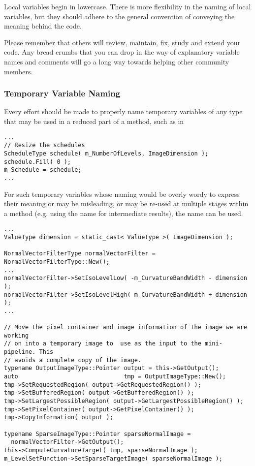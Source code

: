 Local variables begin in lowercase. There is more flexibility in the naming of
local variables, but they should adhere to the general convention of conveying
the meaning behind the code.

Please remember that others will review, maintain, fix, study and extend your
code. Any bread crumbs that you can drop in the way of explanatory variable
names and comments will go a long way towards helping other community members.


\subsubsection{Temporary Variable Naming}
\label{subsubsec:TemporaryVariableNaming}

Every effort should be made to properly name temporary variables of any type
that may be used in a reduced part of a method, such as in
\small
\begin{verbatim}
...
// Resize the schedules
ScheduleType schedule( m_NumberOfLevels, ImageDimension );
schedule.Fill( 0 );
m_Schedule = schedule;
...
\end{verbatim}
\normalsize

For such temporary variables whose naming would be overly wordy to
express their meaning or may be misleading, or may be re-used at multiple
stages within a method (e.g. using the name  for intermediate
results), the name  can be used.
\small
\begin{verbatim}
...
ValueType dimension = static_cast< ValueType >( ImageDimension );

NormalVectorFilterType normalVectorFilter = NormalVectorFilterType::New();
...
normalVectorFilter->SetIsoLevelLow( -m_CurvatureBandWidth - dimension );
normalVectorFilter->SetIsoLevelHigh( m_CurvatureBandWidth + dimension );
...

// Move the pixel container and image information of the image we are working
// on into a temporary image to  use as the input to the mini-pipeline. This
// avoids a complete copy of the image.
typename OutputImageType::Pointer output = this->GetOutput();
auto                              tmp = OutputImageType::New();
tmp->SetRequestedRegion( output->GetRequestedRegion() );
tmp->SetBufferedRegion( output->GetBufferedRegion() );
tmp->SetLargestPossibleRegion( output->GetLargestPossibleRegion() );
tmp->SetPixelContainer( output->GetPixelContainer() );
tmp->CopyInformation( output );

typename SparseImageType::Pointer sparseNormalImage =
  normalVectorFilter->GetOutput();
this->ComputeCurvatureTarget( tmp, sparseNormalImage );
m_LevelSetFunction->SetSparseTargetImage( sparseNormalImage );
\end{verbatim}
\normalsize



